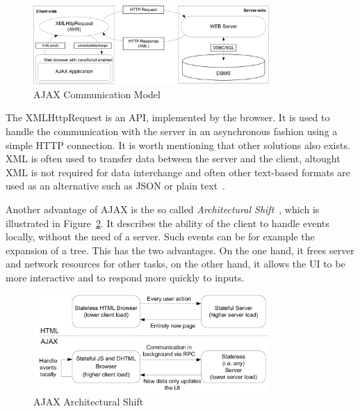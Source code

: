 \begin{figure}[h]
	\begin{center}
		\includegraphics[width=0.8\textwidth]{./img/ajax01.png}
		\caption{AJAX Communication Model}
		\label{fig:ajax01}
	\end{center}
\end{figure}

The XMLHttpRequest is an API, implemented by the browser. It is 
used to handle the communication with the server in an asynchronous fashion using a
simple HTTP connection. It is worth mentioning that other solutions also exists. 
XML is often used to transfer data between the server and the client, 
altought XML is not required for data interchange and often other text-based
formats are used as an alternative such as JSON or plain text~\cite{bajax1}.

Another advantage of AJAX is the so called \textit{Architectural Shift}~\cite{wgdd1}, 
which is illustrated in Figure~\ref{fig:ajax02}. 
It describes the ability of the client to handle events
locally, without the need of a server. Such events can be for example the
expansion of a tree. This has the two advantages. On the one hand, it frees server 
and network resources for other tasks, on the other hand, it allows
the UI to be more interactive and to respond more quickly to inputs.

\begin{figure}[h]
	\begin{center}
		\includegraphics[width=0.8\textwidth]{./img/ajax02.png}
		\caption{AJAX Architectural Shift}
		\label{fig:ajax02}
	\end{center}
\end{figure}

